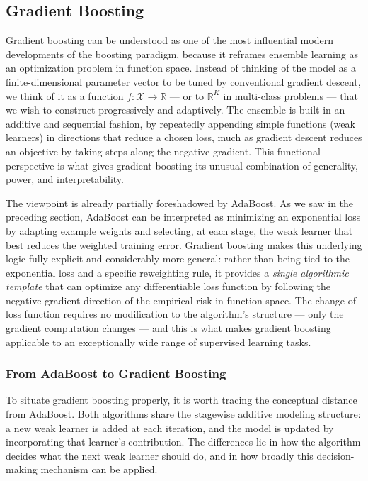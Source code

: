 \subsection*{Gradient Boosting}

Gradient boosting can be understood as one of the most influential modern developments of the boosting paradigm, because it reframes ensemble learning as an \alert{optimization problem in function space}. Instead of thinking of the model as a finite-dimensional parameter vector to be tuned by conventional gradient descent, we think of it as a function $f : \mathcal{X} \to \mathbb{R}$ --- or to $\mathbb{R}^K$ in multi-class problems --- that we wish to construct progressively and adaptively. The ensemble is built in an additive and sequential fashion, by repeatedly appending simple functions (weak learners) in directions that reduce a chosen loss, much as gradient descent reduces an objective by taking steps along the negative gradient. This functional perspective is what gives gradient boosting its unusual combination of generality, power, and interpretability.

The viewpoint is already partially foreshadowed by AdaBoost. As we saw in the preceding section, AdaBoost can be interpreted as minimizing an exponential loss by adapting example weights and selecting, at each stage, the weak learner that best reduces the weighted training error. Gradient boosting makes this underlying logic fully explicit and considerably more general: rather than being tied to the exponential loss and a specific reweighting rule, it provides a \emph{single algorithmic template} that can optimize \alert{any differentiable loss function} by following the negative gradient direction of the empirical risk in function space. The change of loss function requires no modification to the algorithm's structure --- only the gradient computation changes --- and this is what makes gradient boosting applicable to an exceptionally wide range of supervised learning tasks.

\subsubsection*{From AdaBoost to Gradient Boosting}

To situate gradient boosting properly, it is worth tracing the conceptual distance from AdaBoost. Both algorithms share the stagewise additive modeling structure: a new weak learner is added at each iteration, and the model is updated by incorporating that learner's contribution. The differences lie in how the algorithm decides what the next weak learner should do, and in how broadly this decision-making mechanism can be applied.

